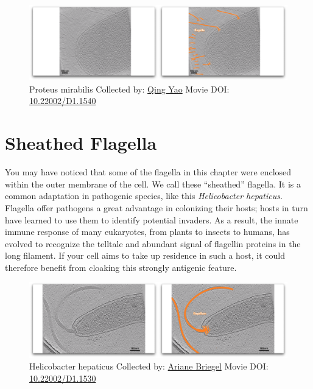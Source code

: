\documentclass[]{tufte-book}
\begin{document}
\begin{figure}
\includegraphics{movie_stills/6_5a} \caption[Proteus mirabilis Collected by:
\protect\hyperlink{qing_yao}{Qing Yao} Movie DOI:
\href{https://doi.org/10.22002/D1.1540}{10.22002/D1.1540}]{Proteus mirabilis Collected by:
\protect\hyperlink{qing_yao}{Qing Yao} Movie DOI:
\href{https://doi.org/10.22002/D1.1540}{10.22002/D1.1540}}\label{fig:6-5a}
\end{figure}

\section{Sheathed Flagella}\label{sheathed-flagella}

You may have noticed that some of the flagella in this chapter were
enclosed within the outer membrane of the cell. We call these
``sheathed'' flagella. It is a common adaptation in pathogenic species,
like this \emph{Helicobacter hepaticus}. Flagella offer pathogens a
great advantage in colonizing their hosts; hosts in turn have learned to
use them to identify potential invaders. As a result, the innate immune
response of many eukaryotes, from plants to insects to humans, has
evolved to recognize the telltale and abundant signal of flagellin
proteins in the long filament. If your cell aims to take up residence in
such a host, it could therefore benefit from cloaking this strongly
antigenic feature.





\begin{figure}
\includegraphics{movie_stills/6_6} \caption[Helicobacter hepaticus Collected by:
\protect\hyperlink{ariane_briegel}{Ariane Briegel} Movie DOI:
\href{https://doi.org/10.22002/D1.1530}{10.22002/D1.1530}]{Helicobacter hepaticus Collected by:
\protect\hyperlink{ariane_briegel}{Ariane Briegel} Movie DOI:
\href{https://doi.org/10.22002/D1.1530}{10.22002/D1.1530}}\label{fig:6-6}
\end{figure}
\end{document}
